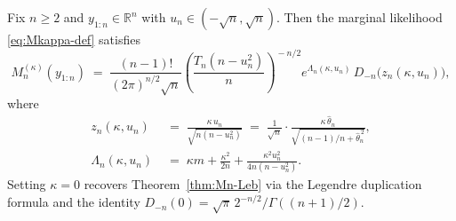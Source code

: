 \documentclass[12pt, a4paper]{report}
\newcommand{\1}{\mathbf{1}}
\begin{document}
\begin{theorem}\label{thm:Mn-kappa}
Fix $n\geq 2$ and $y_{1:n}\in\mathbb{R}^n$ with $u_n\in(-\sqrt n,\sqrt n)$.
Then the marginal likelihood \eqref{eq:Mkappa-def} satisfies
\begin{equation}\label{eq:Mn-kappa}
  M_n^{(\kappa)}(y_{1:n})
  \;=\;\frac{(n-1)!}{(2\pi)^{n/2}\sqrt n}
  \left(\frac{T_n(n-u_n^2)}{n}\right)^{\!-n/2}\!
  e^{\Lambda_n(\kappa,u_n)}\,
  D_{-n}\!\bigl(z_n(\kappa,u_n)\bigr),
\end{equation}
where
\begin{align}
  z_n(\kappa,u_n)
  &\;=\;\frac{\kappa\,u_n}{\sqrt{n(n-u_n^2)}}
  \;=\;\frac{1}{\sqrt n}\cdot
  \frac{\kappa\,\widehat\theta_n}{\sqrt{(n-1)/n+\widehat\theta_n^{\,2}}},
  \label{eq:zn}\\[2pt]
  \Lambda_n(\kappa,u_n)
  &\;=\;\kappa m+\frac{\kappa^2}{2n}
  +\frac{\kappa^2 u_n^2}{4n(n-u_n^2)}.
  \label{eq:Lambdan}
\end{align}
Setting $\kappa=0$ recovers Theorem~\ref{thm:Mn-Leb} via the Legendre
duplication formula and the identity
$D_{-n}(0)=\sqrt\pi\,2^{-n/2}/\Gamma((n+1)/2)$.
\end{theorem}
\end{document}
